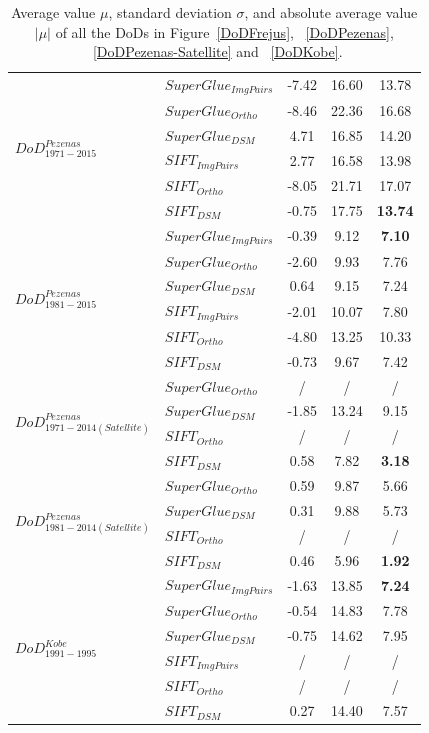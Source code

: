 \begin{table}
\begin{tabular}{||l|l|c|c|c||}
\multirow{6}{*}{$DoD^{Pezenas}_{1971-2015}$}
&${SuperGlue_{ImgPairs}}$ & -7.42 & 16.60 & 13.78\\
&${SuperGlue_{Ortho}}$ & -8.46 & 22.36 & 16.68\\
&${SuperGlue_{DSM}}$ & 4.71 & 16.85 & 14.20\\
&${SIFT_{ImgPairs}}$ & 2.77 & 16.58 & 13.98\\
&${SIFT_{Ortho}}$ & -8.05 & 21.71 & 17.07\\
&${SIFT_{DSM}}$ & -0.75 & 17.75 & \textbf{13.74}\\\hline

\multirow{6}{*}{$DoD^{Pezenas}_{1981-2015}$}
&${SuperGlue_{ImgPairs}}$ & -0.39 & 9.12 & \textbf{7.10}\\
&${SuperGlue_{Ortho}}$ & -2.60 & 9.93 & 7.76\\
&${SuperGlue_{DSM}}$ & 0.64 & 9.15 & 7.24\\
&${SIFT_{ImgPairs}}$ & -2.01 & 10.07 & 7.80\\
&${SIFT_{Ortho}}$ & -4.80 & 13.25 & 10.33\\
&${SIFT_{DSM}}$ & -0.73 & 9.67 & 7.42\\\hline

\multirow{4}{*}{$DoD^{Pezenas}_{1971-2014(Satellite)}$}
&${SuperGlue_{Ortho}}$ & / & / & /\\
&${SuperGlue_{DSM}}$ & -1.85 & 13.24 & 9.15\\
&${SIFT_{Ortho}}$ & / & / & /\\
&${SIFT_{DSM}}$ & 0.58 & 7.82 & \textbf{3.18}\\\hline

\multirow{4}{*}{$DoD^{Pezenas}_{1981-2014(Satellite)}$}
&${SuperGlue_{Ortho}}$ & 0.59 & 9.87 & 5.66\\
&${SuperGlue_{DSM}}$ & 0.31 & 9.88 & 5.73\\
&${SIFT_{Ortho}}$ & / & / & /\\
&${SIFT_{DSM}}$ & 0.46 & 5.96 & \textbf{1.92}\\\hline


\multirow{6}{*}{$DoD^{Kobe}_{1991-1995}$}
&${SuperGlue_{ImgPairs}}$ & -1.63 & 13.85 & \textbf{7.24}\\
&${SuperGlue_{Ortho}}$ & -0.54 & 14.83 & 7.78\\
&${SuperGlue_{DSM}}$ & -0.75 & 14.62 & 7.95\\
&${SIFT_{ImgPairs}}$ & / & / & / \\
&${SIFT_{Ortho}}$ & / & / & / \\
&${SIFT_{DSM}}$ & 0.27 & 14.40 & 7.57\\\hline
	
\end{tabular}
\caption{Average value $\mu$, standard deviation $\sigma$, and absolute average value $|\mu|$ of all the DoDs in Figure~\ref{DoDFrejus}, ~\ref{DoDPezenas}, ~\ref{DoDPezenas-Satellite} and ~\ref{DoDKobe}.}
\label{DoDStatistic}
\end{table}


